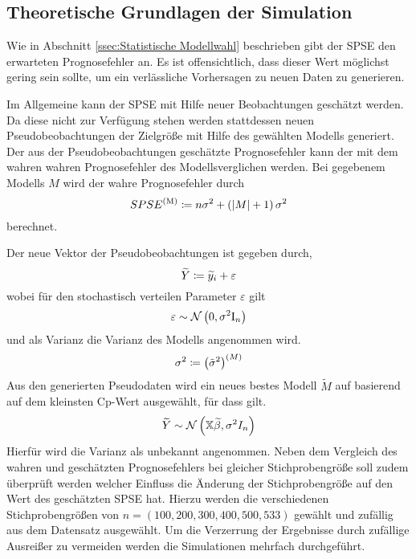     



	\subsection{Theoretische Grundlagen der Simulation}
	\label{ssec:Theoretische Grundlagen der Simulation}

        Wie in Abschnitt \ref{ssec:Statistische Modellwahl} beschrieben gibt der SPSE den erwarteten Prognosefehler an.
        Es ist offensichtlich, dass dieser Wert möglichst gering sein sollte, um ein verlässliche Vorhersagen zu neuen Daten zu generieren.
     
        Im Allgemeine kann der SPSE mit Hilfe neuer Beobachtungen geschätzt werden.\cite{Schumacher Skript}
        Da diese nicht zur Verfügung stehen werden stattdessen neuen Pseudobeobachtungen der Zielgröße mit Hilfe des gewählten Modells generiert.
        Der aus der Pseudobeobachtungen geschätzte Prognosefehler kann der mit dem wahren wahren Prognosefehler des Modellsverglichen werden.
        Bei gegebenem Modells $M$ wird der wahre Prognosefehler durch
        \[
            SPSE^{\mathrm{(M)}} \coloneqq  n \sigma^2 + \left( \left\vert M \right\vert+1 \right) \sigma^2
        \]
        berechnet.
        
        Der neue Vektor der Pseudobeobachtungen ist gegeben durch,
        \[
            \widetilde{Y} \coloneqq \widetilde{y}_i + \varepsilon
        \]
        wobei für den stochastisch verteilen Parameter $\varepsilon$ gilt
        \[
            \varepsilon \sim \mathcal{N} \left( 0,\sigma^2\mathrm{I}_n \right) 
        \]
        und als Varianz die Varianz des Modells angenommen wird.
        \[
            \sigma^2 \coloneqq \left( \tilde{\sigma}^2 \right)^{(M)}
        \]
        Aus den generierten Pseudodaten wird ein neues bestes Modell $\widetilde{M}$ auf basierend auf dem kleinsten Cp-Wert ausgewählt, für dass gilt.
        \[
            \widetilde{Y} \sim \mathcal{N} \left( \mathbb{X}\widetilde{\beta}, \sigma^2 I_n \right)
        \]
        Hierfür wird die Varianz als unbekannt angenommen.
        Neben dem Vergleich des wahren und geschätzten Prognosefehlers bei gleicher Stichprobengröße soll zudem überprüft werden welcher Einfluss die Änderung der Stichprobengröße auf den Wert des geschätzten SPSE hat.
        Hierzu werden die verschiedenen Stichprobengrößen von $n = (100, 200, 300, 400, 500, 533)$ gewählt und zufällig aus dem Datensatz ausgewählt.
        Um die Verzerrung der Ergebnisse durch zufällige Ausreißer zu vermeiden werden die Simulationen mehrfach durchgeführt.
        
        
